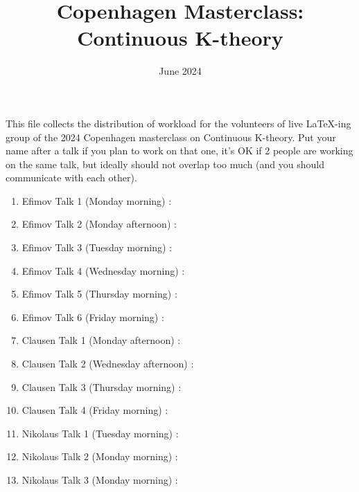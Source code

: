 \documentclass{article}
\title{Copenhagen Masterclass: Continuous K-theory}
\date{June 2024}
\begin{document}
\maketitle

This file collects the distribution of  workload for the volunteers of live \LaTeX -ing group of the 2024 Copenhagen masterclass on Continuous K-theory. Put your name after a talk if you plan to work on that one, it's OK if 2 people are working on the same talk, but ideally should not overlap too much (and you should communicate with each other).
\begin{enumerate}
    \item Efimov Talk 1 (Monday morning) : 
    \item Efimov Talk 2 (Monday afternoon) : 
    \item Efimov Talk 3 (Tuesday morning) : 
    \item Efimov Talk 4 (Wednesday morning) : 
    \item Efimov Talk 5 (Thursday morning) : 
    \item Efimov Talk 6 (Friday morning) : 
    \item Clausen Talk 1 (Monday afternoon) : 
    \item Clausen Talk 2 (Wednesday afternoon) : 
    \item Clausen Talk 3 (Thursday morning) : 
    \item Clausen Talk 4 (Friday morning) : 
    \item Nikolaus Talk 1 (Tuesday morning) : 
    \item Nikolaus Talk 2 (Monday morning) : 
    \item Nikolaus Talk 3 (Monday morning) : 
        
\end{enumerate}
\end{document}

